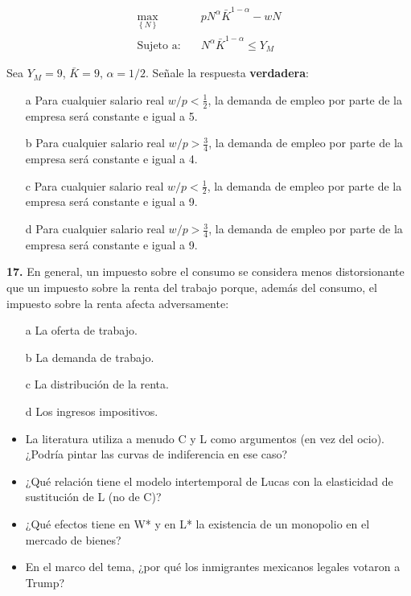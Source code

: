 \documentclass{nuevotema}
\begin{document}
\begin{align*}
	\underset{\left\lbrace N \right\rbrace }{\max}\quad &p N^\alpha \bar{K}^{1-\alpha} - w N \\
	\text{Sujeto a:}\quad &N^\alpha \bar{K}^{1-\alpha} \leq Y_M 
\end{align*}

Sea $Y_M = 9$, $\bar{K} = 9$, $\alpha = 1/2$. Señale la respuesta \textbf{verdadera}:
\begin{enumerate}
	\item[a] Para cualquier salario real $w/p< \frac{1}{2}$, la demanda de empleo por parte de la empresa será constante e igual a 5.
	\item[b] Para cualquier salario real $w/p> \frac{3}{4}$, la demanda de empleo por parte de la empresa será constante e igual a 4.
	\item[c] Para cualquier salario real $w/p< \frac{1}{2}$, la demanda de empleo por parte de la empresa será constante e igual a 9.
	\item[d] Para cualquier salario real $w/p> \frac{3}{4}$, la demanda de empleo por parte de la empresa será constante e igual a 9.
\end{enumerate}


\textbf{17.} En general, un impuesto sobre el consumo se considera menos distorsionante que un impuesto sobre la renta del trabajo porque, además del consumo, el impuesto sobre la renta afecta adversamente:
\begin{enumerate}
	\item[a] La oferta de trabajo.
	\item[b] La demanda de trabajo.
	\item[c] La distribución de la renta.
	\item[d] Los ingresos impositivos.
\end{enumerate}


\begin{itemize}
    \item La literatura utiliza a menudo C y L como argumentos (en vez del ocio). ¿Podría pintar las curvas de indiferencia en ese caso?
    \item ¿Qué relación tiene el modelo intertemporal de Lucas con la elasticidad de sustitución de L (no de C)?
    \item ¿Qué efectos tiene en W* y en L* la existencia de un monopolio en el mercado de bienes?
    \item En el marco del tema, ¿por qué los inmigrantes mexicanos legales votaron a Trump?
\end{itemize}
\end{document}
